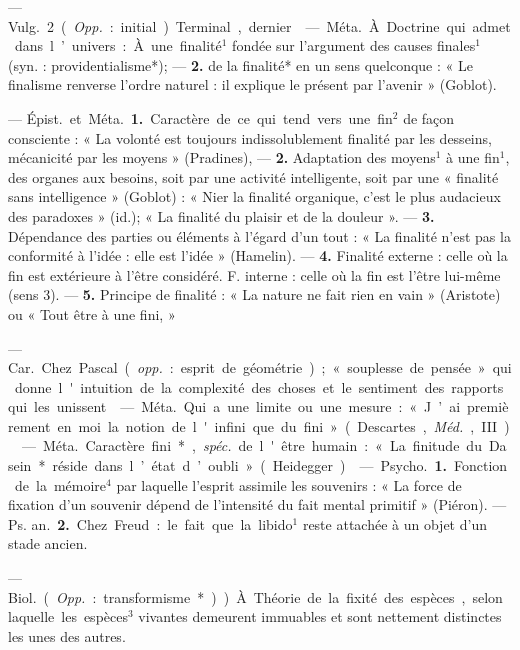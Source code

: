 \begin{itemize}[leftmargin=1cm, label=, itemsep=1pt]
— \si{Vulg.} 2 ({\it Opp.} : initial). Terminal, dernier.

 — \si{Méta.} À. Doctrine qui
admet dans l’univers : À. une finalité$^1$ fondée sur l'argument des
causes finales$^1$ (syn. : providentialisme*); — {\bf 2.} de la finalité* en un
sens quelconque : « Le finalisme renverse l’ordre naturel : il explique le
présent par l'avenir » (Goblot).

 — \si{Épist.} et \si{Méta.} {\bf 1.} Caractère de ce qui tend vers une fin$^2$ de
façon consciente : « La volonté est
toujours indissolublement finalité
par les desseins, mécanicité par les
moyens » (Pradines), — {\bf 2.} Adaptation des moyens$^1$ à une fin$^1$, des
organes aux besoins, soit par une
activité intelligente, soit par une
« finalité sans intelligence » (Goblot) :
« Nier la finalité organique, c'est le
plus audacieux des paradoxes » (id.);
« La finalité du plaisir et de la douleur ».
— {\bf 3.} Dépendance des parties
ou éléments à l'égard d’un tout :
« La finalité n’est pas la conformité
à l’idée : elle est l'idée » (Hamelin).
— {\bf 4.} Finalité externe : celle où la
fin est extérieure à l'être considéré.
F. interne : celle où la fin est l'être
lui-même (sens 3). — {\bf 5.} Principe de
finalité : « La nature ne fait rien en
vain » (Aristote) ou « Tout être à
une fini, »

 — \si{Car.} Chez
Pascal ({\it opp.} : esprit de géométrie);
« souplesse de pensée » qui donne
l'intuition de la complexité des
choses et le sentiment des rapports
qui les unissent.

 — \si{Méta.} Qui a une limite ou une
mesure : « J’ai premièrement en
moi la notion de l'infini que du fini»
(Descartes, \si{{\it Méd.}}, III).

 — \si{Méta.} Caractère fini*, {\it spéc.}
de l'être humain : « La finitude du
Dasein* réside dans l’état d’oubli »
(Heidegger).

 — \si{Psycho.} {\bf 1.} Fonction de la
mémoire$^4$ par laquelle l’esprit assimile les souvenirs : « La force de
fixation d’un souvenir dépend de
l'intensité du fait mental primitif »
(Piéron). — \si{Ps. an.} {\bf 2.} Chez Freud:
le fait que la libido$^1$ reste attachée
à un objet d’un stade ancien.

 — \si{Biol.} ({\it Opp.} : transformisme*)). À. Théorie de la fixité des
espèces, selon laquelle les espèces$^3$
vivantes demeurent immuables et
sont nettement distinctes les unes
des autres.


\end{itemize}
